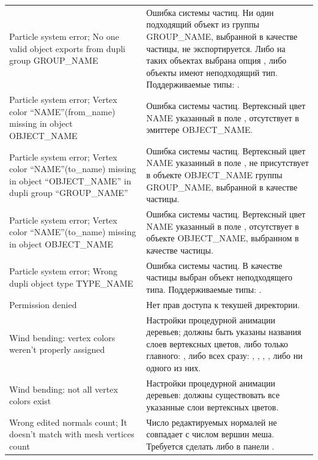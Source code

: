 \documentclass[a4paper,12pt,oneside]{sphinxmanual}
\begin{document}
\begin{tabulary}{\linewidth}{|L|L|}
\hline

Particle system error; No one valid
object exports from dupli group
GROUP\_NAME
 & 
Ошибка системы частиц. Ни один подходящий
объект из группы GROUP\_NAME, выбранной в
качестве частицы, не экспортируется.
Либо на таких объектах выбрана опция
, либо объекты имеют
неподходящий тип.
Поддерживаемые типы: .
\\

Particle system error; Vertex color
``NAME''(from\_name) missing in object
OBJECT\_NAME
 & 
Ошибка системы частиц. Вертексный цвет
NAME указанный в поле ,
отсутствует в эмиттере OBJECT\_NAME.
\\

Particle system error; Vertex color
``NAME''(to\_name) missing in object
``OBJECT\_NAME'' in dupli group
``GROUP\_NAME''
 & 
Ошибка системы частиц. Вертексный цвет
NAME указанный в поле , не
присутствует в объекте OBJECT\_NAME группы
GROUP\_NAME, выбранной в качестве частицы.
\\

Particle system error; Vertex color
``NAME''(to\_name) missing in object
OBJECT\_NAME
 & 
Ошибка системы частиц. Вертексный цвет
NAME указанный в поле , отсутствует
в объекте OBJECT\_NAME, выбранном в
качестве частицы.
\\

Particle system error; Wrong dupli
object type TYPE\_NAME
 & 
Ошибка системы частиц. В качестве частицы
выбран объект неподходящего типа.
Поддерживаемые типы: .
\\

Permission denied
 & 
Нет прав доступа к текушей директории.
\\

Wind bending: vertex colors weren't
properly assigned
 & 
Настройки процедурной анимации деревьев;
должны быть указаны названия слоев
вертексных цветов, либо только главного:
,
либо всех сразу:
,
,
,
,
либо ни одного из них.
\\

Wind bending: not all
vertex colors exist
 & 
Настройки процедурной анимации деревьев:
должны существовать все указанные
слои вертексных цветов.
\\

Wrong edited normals count; It
doesn't match with mesh vertices
count
 & 
Число редактируемых нормалей не
совпадает с числом вершин меша.
Требуется сделать  либо
 в панели
.
\\


\end{tabulary}
\end{document}
